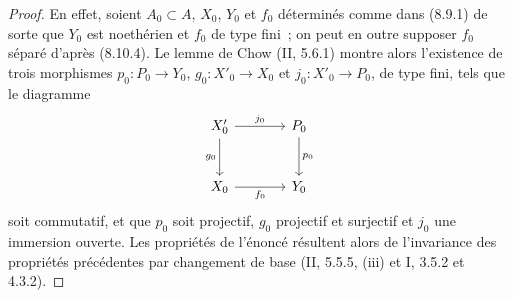 \begin{proof}
En effet, soient $A_0\subset A$, $X_0$, $Y_0$ et $f_0$ déterminés comme dans
(8.9.1) de sorte que $Y_0$ est noethérien et $f_0$ de type fini~; on peut en
outre supposer $f_0$ séparé d'après (8.10.4). Le lemme de Chow (II, 5.6.1)
montre alors l'existence de trois morphismes $p_0:P_0\to Y_0$,
$g_0:X'_0\to X_0$ et $j_0:X'_0\to P_0$, de type fini, tels que le diagramme
\[
\begin{tikzcd}[column sep=large,row sep=large]
X'_0 \arrow[r,"j_0"] \arrow[d,"g_0"'] & P_0 \arrow[d,"p_0"] \\
X_0 \arrow[r,"f_0"'] & Y_0
\end{tikzcd}
\]
soit commutatif, et que $p_0$ soit projectif, $g_0$ projectif et surjectif et
$j_0$ une immersion ouverte. Les propriétés de l'énoncé résultent alors de
l'invariance des propriétés précédentes par changement de base (II, 5.5.5,
(iii) et I, 3.5.2 et 4.3.2).
\end{proof}

